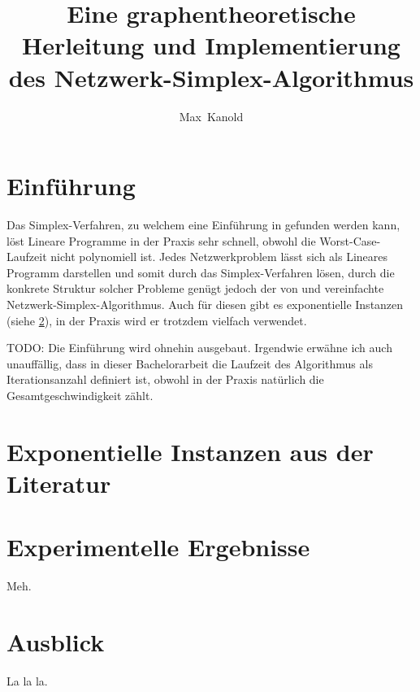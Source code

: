 \documentclass[a4paper,twoside,ngerman]{report}
\author{Max~Kanold}
\title{Eine graphentheoretische Herleitung und Implementierung des Netzwerk-Simplex-Algorithmus}
\theoremstyle{plain}
\theoremstyle{definition}
\begin{document}
\maketitle
\cleardoublepage
\tableofcontents
\cleardoublepage

\chapter{Einführung}
Das Simplex-Verfahren, zu welchem eine Einführung in \cite{NSAbook} gefunden werden kann, löst Lineare Programme in der Praxis sehr schnell, obwohl die Worst-Case-Laufzeit nicht polynomiell ist. Jedes Netzwerkproblem lässt sich als Lineares Programm darstellen und somit durch das Simplex-Verfahren lösen, durch die konkrete Struktur solcher Probleme genügt jedoch der von \cite[Dantzig, 1951]{erf1} und \cite[Orden, 1956]{erf2} vereinfachte Netzwerk-Simplex-Algorithmus. Auch für diesen gibt es exponentielle Instanzen (siehe \cref{ch:lit}), in der Praxis wird er trotzdem vielfach verwendet.

TODO: Die Einführung wird ohnehin ausgebaut. Irgendwie erwähne ich auch unauffällig, dass in dieser Bachelorarbeit die Laufzeit des Algorithmus als Iterationsanzahl definiert ist, obwohl in der Praxis natürlich die Gesamtgeschwindigkeit zählt.



\chapter{Exponentielle Instanzen aus der Literatur}\label{ch:lit}

\chapter{Experimentelle Ergebnisse}\label{ch:erg}
Meh.

\chapter{Ausblick}
La la la.

{}

\end{document}

